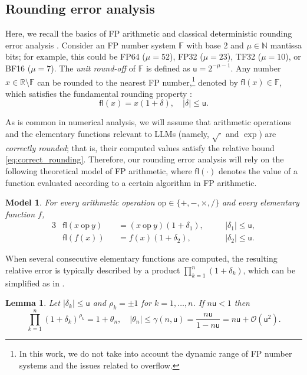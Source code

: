 \documentclass[namedate,webpdf,imanum]{ima-authoring-template}
\newcommand{\Real}{\mathbb{R}}
\newcommand{\N}{\mathbb{N}}
\newcommand{\F}{\mathbb{F}}
\newcommand{\fl}[2][]{\mathsf{fl}#1( #2 #1)}
\newcommand{\uh}{\mathsf{u}}
\newcommand{\Oh}[2][]{\mathcal{O}#1( #2 #1)}
\newtheorem{lemma}[theorem]{Lemma}
\newtheorem{model}[theorem]{Model}
\numberwithin{equation}{section}
\begin{document}
\subsection{Rounding error analysis}
\label{subsec:rounding_error_analysis}
Here, we recall the basics of FP arithmetic and classical deterministic rounding error analysis \citep{higham2002accuracy, muller2018handbook}.
Consider an FP number system $\F$ with base 2 and $\mu \in \N$ mantissa bits; for example, this could be FP64 ($\mu = 52$), FP32 ($\mu = 23$), TF32 ($\mu = 10$), or BF16 ($\mu = 7$).
The \emph{unit round-off} of $\F$ is defined as $\uh = 2^{-\mu-1}$.
Any number $x \in \Real \setminus \F$ can be rounded to the nearest FP number,\footnote{In this work, we do not take into account the dynamic range of FP number systems and the issues related to overflow.} denoted by $\fl{x} \in \F$, which satisfies the fundamental rounding property \citep[Thm.~2.2]{higham2002accuracy}:
\begin{equation}
\label{eq:correct_rounding}
    \fl{x} = x(1 + \delta), \quad |\delta| \leq \uh.
\end{equation}

As is common in numerical analysis, we will assume that arithmetic operations and the elementary functions relevant to LLMs (namely, $\sqrt{\cdot}$ and $\exp$) are \emph{correctly rounded}; that is, their computed values satisfy the relative bound \eqref{eq:correct_rounding}.
Therefore, our rounding error analysis will rely on the following theoretical model of FP arithmetic, where $\fl{\cdot}$ denotes the value of a function evaluated according to a certain algorithm in FP arithmetic.

\begin{model}
\label{model:fp_arithmetic}
For every arithmetic operation $\mathrm{op} \in \{ +, -, \times, / \}$ and every elementary function $f$,
\begin{alignat*}{3}
    &\fl{x~\mathrm{op}~y} &&= (x~\mathrm{op}~y)(1 + \delta_1), &&\quad |\delta_1| \leq \uh, \\
    &\fl{f(x)} &&= f(x) (1 + \delta_2), &&\quad |\delta_2| \leq \uh.
\end{alignat*}
\end{model}

When several consecutive elementary functions are computed, the resulting relative error is typically described by a product $\prod_{k = 1}^{n} (1 + \delta_k)$, which can be simplified as in \cite[Lem.~3.1]{higham2002accuracy}.

\begin{lemma}
\label{lemma:theta_gamma}
Let $|\delta_k| \leq \uh$ and $\rho_k = \pm 1$ for $k = 1, \ldots, n$. If $n \uh < 1$ then
\begin{equation*}
    \prod_{k = 1}^{n} (1 + \delta_k)^{\rho_k} = 1 + \theta_n, \quad |\theta_n| \leq \gamma(n,\uh) = \frac{n\uh}{1 - n\uh} = n\uh + \Oh{\uh^2}.
\end{equation*}
\end{lemma}
\end{document}
